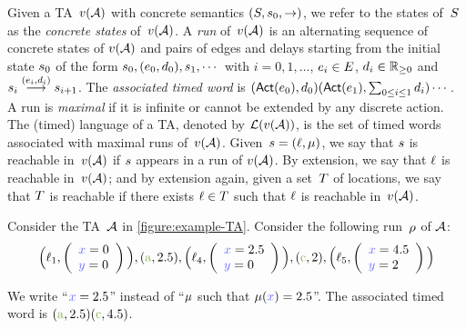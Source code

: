 \begin{tikzborder}{\cite{Gargantini16:validation}}
\begin{tikzborder}{\cite{gargantini_combinatorial_2017}}
\begin{tikzborder}{\cite{garn2019}}
\begin{tikzborder}{\cite{arcaini2019achieving}}
\begin{tikzborder}{\cite{arcaini2019varivolution}}
\begin{tikzborder}{}
Given a TA~$v(\mathcal{A})$ with concrete semantics $(S, s_0, {\rightarrow})$, we refer to the states of~$S$ as the \emph{concrete states} of~$v(\mathcal{A})$.
A \emph{run} of~$v(\mathcal{A})$ is an %
alternating sequence of concrete states of $v(\mathcal{A})$ and pairs of edges and delays starting from the initial state $s_0$ of the form
$s_0, (e_0, d_0), s_1, \cdots$
with
$i = 0, 1, \dots$, $e_i \in E$, $d_i \in {\mathbb{R}}_{\geq 0}$ and
$s_i \stackrel{(e_i, d_i)}{\longrightarrow} s_{i+1}$.
The \emph{associated timed word} is $(\mathsf{Act}(e_0) , d_0) (\mathsf{Act}(e_1), \sum_{0 \leq i \leq 1} d_i) \cdots$.
A run is \emph{maximal} if it is infinite or cannot be extended by any discrete action.
The (timed) language of a TA, denoted by $\mathcal{L}(v(\mathcal{A}))$, is the set of timed words associated with maximal runs of~$v(\mathcal{A})$.
Given~$s=(\ell, \mu)$, we say that $s$ is reachable in~$v(\mathcal{A})$ if $s$ appears in a run of $v(\mathcal{A})$.
By extension, we say that $\ell$ is reachable in~$v(\mathcal{A})$; and by extension again, given a set~$T$ of locations, we say that $T$ is reachable if there exists $\ell \in T$ such that $\ell$ is reachable in~$v(\mathcal{A})$.


\begin{example}
	Consider the TA~$\mathcal{A}$ in \ref{figure:example-TA}.
	Consider the following run~$\rho$ of $\mathcal{A}$:
	\[
	\Big(\loc_1,
	\left ( \begin{array}{l}
	\styleclock{x} = 0 \\
	\styleclock{y} = 0 \\
	\end{array}
	\right ) \Big)
	,
	(\styleact{a}, 2.5)
	,
	\Big(\loc_4,
	\left ( \begin{array}{l}
	\styleclock{x} = 2.5 \\
	\styleclock{y} = 0 \\
	\end{array}
	\right ) \Big)
	,
	(\styleact{c}, 2)
	,
	\Big(\loc_5,
	\left ( \begin{array}{l}
	\styleclock{x} = 4.5 \\
	\styleclock{y} = 2 \\
	\end{array}
	\right ) \Big)
	\]
	
	We write ``$\styleclock{\clock} = 2.5$'' instead of ``$\mu$ such that $\clockval(\styleclock{\clock}) = 2.5$''.
	The associated timed word is $(\styleact{a}, 2.5) (\styleact{c}, 4.5)$.
\end{example}
\end{tikzborder}


\end{tikzborder}
\end{tikzborder}
\end{tikzborder}
\end{tikzborder}
\end{tikzborder}
